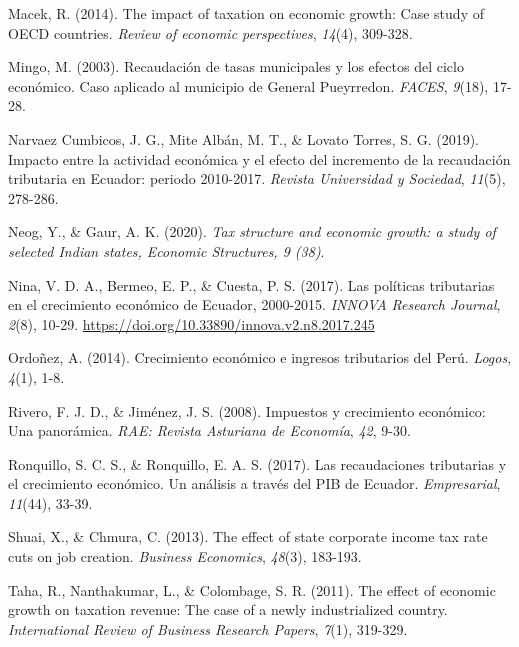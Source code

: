 \documentclass[
  jou,
  floatsintext,
  longtable,
  a4paper,
  nolmodern,
  notxfonts,
  notimes,
  12pt,
  colorlinks=true,linkcolor=blue,citecolor=blue,urlcolor=blue]{apa7}
\newlength{\cslhangindent}
\newenvironment{CSLReferences}[2] %
 {\begin{list}{}{%
  \setlength{\itemindent}{0pt}
  \setlength{\leftmargin}{0pt}
  \setlength{\parsep}{0pt}
  \ifodd #1
   \setlength{\leftmargin}{\cslhangindent}
   \setlength{\itemindent}{-1\cslhangindent}
  \fi
  \setlength{\itemsep}{#2\baselineskip}}}
 {\end{list}}
\begin{document}
\begin{CSLReferences}{1}{0}
Macek, R. (2014). The impact of taxation on economic growth: Case study
of {OECD} countries. \emph{Review of economic perspectives},
\emph{14}(4), 309-328.

Mingo, M. (2003). Recaudación de tasas municipales y los efectos del
ciclo económico. Caso aplicado al municipio de General Pueyrredon.
\emph{{FACES}}, \emph{9}(18), 17-28.

Narvaez Cumbicos, J. G., Mite Albán, M. T., \& Lovato Torres, S. G.
(2019). Impacto entre la actividad económica y el efecto del incremento
de la recaudación tributaria en Ecuador: periodo 2010-2017.
\emph{Revista Universidad y Sociedad}, \emph{11}(5), 278-286.

Neog, Y., \& Gaur, A. K. (2020). \emph{Tax structure and economic
growth: a study of selected Indian states, Economic Structures, 9 (38)}.

Nina, V. D. A., Bermeo, E. P., \& Cuesta, P. S. (2017). Las políticas
tributarias en el crecimiento económico de Ecuador, 2000-2015.
\emph{{INNOVA} Research Journal}, \emph{2}(8), 10-29.
\url{https://doi.org/10.33890/innova.v2.n8.2017.245}

Ordoñez, A. (2014). Crecimiento económico e ingresos tributarios del
Perú. \emph{Logos}, \emph{4}(1), 1-8.

Rivero, F. J. D., \& Jiménez, J. S. (2008). Impuestos y crecimiento
económico: Una panorámica. \emph{{RAE}: Revista Asturiana de Economía},
\emph{42}, 9-30.

Ronquillo, S. C. S., \& Ronquillo, E. A. S. (2017). Las recaudaciones
tributarias y el crecimiento económico. Un análisis a través del {PIB}
de Ecuador. \emph{Empresarial}, \emph{11}(44), 33-39.

Shuai, X., \& Chmura, C. (2013). The effect of state corporate income
tax rate cuts on job creation. \emph{Business Economics}, \emph{48}(3),
183-193.

Taha, R., Nanthakumar, L., \& Colombage, S. R. (2011). The effect of
economic growth on taxation revenue: The case of a newly industrialized
country. \emph{International Review of Business Research Papers},
\emph{7}(1), 319-329.


\end{CSLReferences}
\end{document}
